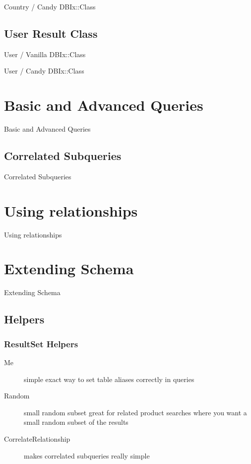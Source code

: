 \begin{frame}{Country / Candy DBIx::Class}

\end{frame}

\subsection{User Result Class}

\begin{frame}{User / Vanilla DBIx::Class}

\end{frame}

\begin{frame}{User / Candy DBIx::Class}

\end{frame}

\section{Basic and Advanced Queries}
\begin{frame}{Basic and Advanced Queries}
\end{frame}

\subsection{Correlated Subqueries}
\begin{frame}{Correlated Subqueries}
\end{frame}

\section{Using relationships}
\begin{frame}{Using relationships}
\end{frame}

\section{Extending Schema}
\begin{frame}{Extending Schema}
\end{frame}

\subsection{Helpers}
\subsubsection{ResultSet Helpers}
\begin{description}
\item[Me] 
simple exact way to set table aliases correctly in queries
\item[Random] small random subset
great for related product searches where you want a small 
random subset of the results
\item[CorrelateRelationship] 
makes correlated subqueries really simple
\end{description}

